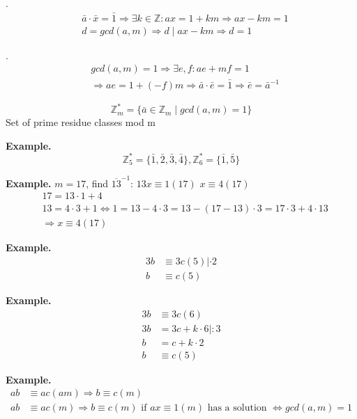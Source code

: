 \ProofForward.
\begin{align*}
  & \bar{a}\cdot \bar{x} = \bar{1} \Rightarrow \exists k\in \mathbb{Z}:
    ax = 1 + km \Rightarrow ax - km = 1\\
  & d = gcd(a,m) \Rightarrow d \mid ax - km \Rightarrow d = 1
\end{align*}

\ProofBackward.
\begin{align*}
  & gcd(a,m) = 1 \Rightarrow \exists e,f : ae + mf = 1\\
  & \Rightarrow ae = 1 + (-f)m \Rightarrow \bar{a} \cdot \bar{e} = \bar{1}
    \Rightarrow \bar{e} = \bar{a}^{-1}
\end{align*}


\begin{definition}
\[
  \mathbb{Z}_m^{*} = \{ \bar{a} \in \mathbb{Z}_m \mid gcd(a,m) = 1 \}
\]
Set of prime residue classes mod m
\end{definition}

\textbf{Example.}
\[
  \mathbb{Z}_5^{*} = \{ \bar{1}, \bar{2}, \bar{3}, \bar{4} \}, \mathbb{Z}_6^{*} = \{ \bar{1}, \bar{5} \}
\]

\textbf{Example.}
$ m = 17$, find $\overline{13}^{-1}$: $ 13 x \equiv 1 (17)$ $x \equiv 4 (17)$
\begin{align*}
  & 17 = 13 \cdot  1 +4\\
  & 13 = 4\cdot 3 +1 \iff 1 = 13-4\cdot 3 = 13-(17-13)\cdot 3 = 17\cdot
    3+4\cdot 13 \\
  & \Rightarrow x \equiv 4 (17)
\end{align*}

\textbf{Example.}
\begin{align*}
  3b &\equiv 3c (5) | \cdot 2 \\
  b &\equiv c(5)
\end{align*}

\textbf{Example.}
\begin{align*}
  3b &\equiv 3c (6) \\
  3b &= 3c + k \cdot 6 | :3 \\
  b &= c + k \cdot 2 \\
  b &\equiv c(5)
\end{align*}

\textbf{Example.}
\begin{align*}
  ab &\equiv ac (am) \Rightarrow b \equiv  c (m) \\
  ab &\equiv ac (m) \Rightarrow b \equiv c (m)
    \text{ if } ax \equiv 1 (m) \text{ has a solution } \iff gcd(a,m) = 1
\end{align*}

